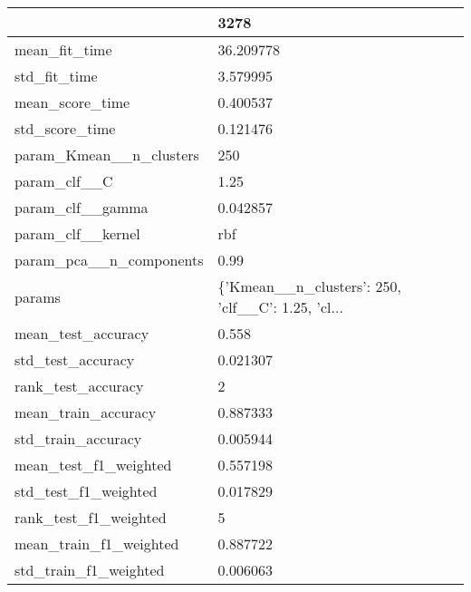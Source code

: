 \begin{tabular}{ll}
\toprule
{} &                                               3278 \\
\midrule
mean\_fit\_time               &                                          36.209778 \\
std\_fit\_time                &                                           3.579995 \\
mean\_score\_time             &                                           0.400537 \\
std\_score\_time              &                                           0.121476 \\
param\_Kmean\_\_n\_clusters     &                                                250 \\
param\_clf\_\_C                &                                               1.25 \\
param\_clf\_\_gamma            &                                           0.042857 \\
param\_clf\_\_kernel           &                                                rbf \\
param\_pca\_\_n\_components     &                                               0.99 \\
params                      &  \{'Kmean\_\_n\_clusters': 250, 'clf\_\_C': 1.25, 'cl... \\
mean\_test\_accuracy          &                                              0.558 \\
std\_test\_accuracy           &                                           0.021307 \\
rank\_test\_accuracy          &                                                  2 \\
mean\_train\_accuracy         &                                           0.887333 \\
std\_train\_accuracy          &                                           0.005944 \\
mean\_test\_f1\_weighted       &                                           0.557198 \\
std\_test\_f1\_weighted        &                                           0.017829 \\
rank\_test\_f1\_weighted       &                                                  5 \\
mean\_train\_f1\_weighted      &                                           0.887722 \\
std\_train\_f1\_weighted       &                                           0.006063 \\

\end{tabular}
